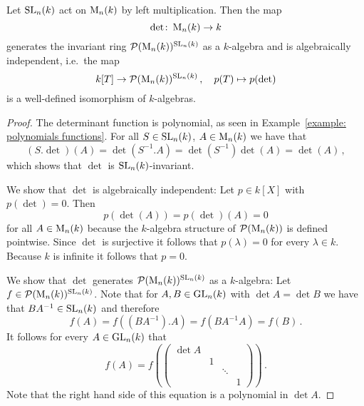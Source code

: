 \begin{theorem}
  \label{theorem: SLn invariants for left multiplication}
  Let $\operatorname{SL}_n(k)$ act on $\operatorname{M}_n(k)$ by left multiplication.
  Then the map
  \[
            \det
    \colon  \operatorname{M}_n(k)
    \to     k
  \]
  generates the invariant ring $\mathcal{P}(\operatorname{M}_n(k))^{\operatorname{SL}_n(k)}$ as a $k$-algebra and is algebraically independent, i.e.\ the map
  \[
            k[T]
    \to     \mathcal{P}(\operatorname{M}_n(k))^{\operatorname{SL}_n(k)} \,,
    \quad   p(T)
    \mapsto p(\det)
  \]
  is a well-defined isomorphism of $k$-algebras.
\end{theorem}
\begin{proof}
  The determinant function is polynomial, as seen in Example~\ref{example: polynomials functions}.
  For all $S \in \operatorname{SL}_n(k)$, $A \in \operatorname{M}_n(k)$ we have that
  \[
      (S.\det)(A)
    = \det\left(S^{-1}.A\right)
    = \det\left( S^{-1} \right) \det(A)
    = \det(A) \,,
  \]
  which shows that $\det$ is $\operatorname{SL}_n(k)$-invariant.
  
  We show that $\det$ is algebraically independent:
  Let $p \in k[X]$ with $p(\det) = 0$.
  Then
  \[
      p(\det(A))
    = p(\det)(A)
    = 0
  \]
  for all $A \in \operatorname{M}_n(k)$ because the $k$-algebra structure of $\mathcal{P}(\operatorname{M}_n(k))$ is defined pointwise.
  Since $\det$ is surjective it follows that $p(\lambda) = 0$ for every $\lambda \in k$.
  Because $k$ is infinite it follows that $p = 0$.
  
  We show that $\det$ generates $\mathcal{P}(\operatorname{M}_n(k))^{\operatorname{SL}_n(k)}$ as a $k$-algebra:
  Let $f \in \mathcal{P}(\operatorname{M}_n(k))^{\operatorname{SL}_n(k)}$.
  Note that for $A, B \in \operatorname{GL}_n(k)$ with $\det A = \det B$ we have that $B A^{-1} \in \operatorname{SL}_n(k)$ and therefore
  \[
      f(A)
    = f\left( (BA^{-1}).A \right)
    = f(B A^{-1} A)
    = f(B) \,.
  \]
  It follows for every $A \in \operatorname{GL}_n(k)$ that
  \begin{equation}
    \label{equation: reduction for GLn}
      f(A)
    = f\left(
        \begin{pmatrix}
          \det A  &   &         &   \\
                  & 1 &         &   \\
                  &   & \ddots  &   \\
                  &   &         & 1
        \end{pmatrix}
      \right) \,.
  \end{equation}
  Note that the right hand side of this equation is a polynomial in $\det A$.
  

\end{proof}
